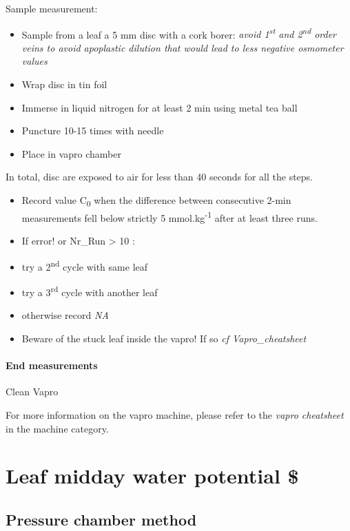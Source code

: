 \documentclass[
  12pt,
  american,
  a4paper,
  extrafontsizes,onecolumn,openright
  ]{memoir}
\providecommand{\tightlist}{%
  \setlength{\itemsep}{0pt}\setlength{\parskip}{0pt}}
\begin{document}
Sample measurement:

\begin{itemize}
\tightlist
\item
  Sample from a leaf a 5 mm disc with a cork borer: \emph{avoid 1\textsuperscript{st} and 2\textsuperscript{nd} order veins to avoid apoplastic dilution that would lead to less negative osmometer values}
\item
  Wrap disc in tin foil
\item
  Immerse in liquid nitrogen for at least 2 min using metal tea ball
\item
  Puncture 10-15 times with needle
\item
  Place in vapro chamber
\end{itemize}

In total, disc are exposed to air for less than 40 seconds for all the steps.

\begin{itemize}
\item
  Record value C\textsubscript{0} when the difference between consecutive 2-min measurements fell below strictly 5 mmol.kg\textsuperscript{-1} after at least three runs.
\item
  If error! or Nr\_Run \textgreater{} 10 :
\item
  try a 2\textsuperscript{nd} cycle with same leaf
\item
  try a 3\textsuperscript{rd} cycle with another leaf
\item
  otherwise record \emph{NA}
\item
  Beware of the stuck leaf inside the vapro! If so \emph{cf Vapro\_cheatsheet}
\end{itemize}

\hypertarget{end-measurements}{%
\paragraph{End measurements}\label{end-measurements}}

Clean Vapro

For more information on the vapro machine, please refer to the \emph{vapro cheatsheet} in the machine category.

\hypertarget{leaf-midday-water-potential}{%
\section{Leaf midday water potential \$}\label{leaf-midday-water-potential}}

\hypertarget{pressure-chamber-method}{%
\subsection{Pressure chamber method}\label{pressure-chamber-method}}
\end{document}
